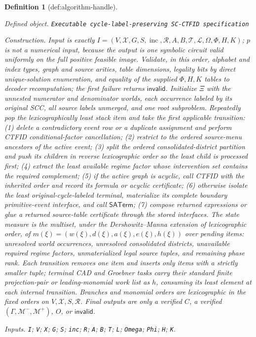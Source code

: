 \documentclass{article}
\newtheorem{definition}{Definition}
\begin{document}
\begin{definition}[def:algorithm-handle]\label{def:algorithm-handle}
\par\smallskip\noindent\emph{Defined object.} \texttt{Executable cycle-\allowbreak{}label-\allowbreak{}preserving SC-\allowbreak{}CTFID specification}
\par\smallskip\noindent\emph{Construction.} Input is exactly \(I=(V,\mathcal X,G,S,\operatorname{inc},\mathcal R,A,B,\mathcal T,\mathcal L,\Omega,\Phi,H,K)\); \(p\) is not a numerical input, because the output is one symbolic circuit valid uniformly on the full positive feasible image. Validate, in this order, alphabet and index types, graph and source arities, table dimensions, legality bits by direct unique-solution enumeration, and equality of the supplied \(\Phi,H,K\) tables to decoder recomputation; the first failure returns \(\mathsf{invalid}\). Initialize \(\Xi\) with the unnested numerator and denominator worlds, each occurrence labeled by its original SCC, all source labels unmerged, and one root subproblem. Repeatedly pop the lexicographically least stack item and take the first applicable transition: (1) delete a contradictory event row or a duplicate assignment and perform CTFID conditional-factor cancellation; (2) restrict to the ordered source-menu ancestors of the active event; (3) split the ordered consolidated-district partition and push its children in reverse lexicographic order so the least child is processed first; (4) extract the least available regime factor whose intervention set contains the required complement; (5) if the active graph is acyclic, call CTFID with the inherited order and record its formula or acyclic certificate; (6) otherwise isolate the least original-cycle-labeled terminal, materialize its complete boundary primitive-event interface, and call \(\mathsf{SATerm}\); (7) compose returned expressions or glue a returned source-table certificate through the stored interfaces. The state measure is the multiset, under the Dershowitz--Manna extension of lexicographic order, of \(m(\xi)=(w(\xi),d(\xi),a(\xi),e(\xi),h(\xi))\) over pending items: unresolved world occurrences, unresolved consolidated districts, unavailable required regime factors, unmaterialized legal source tuples, and remaining phase rank. Each transition removes one item and inserts only items with a strictly smaller tuple; terminal CAD and Groebner tasks carry their standard finite projection-pair or leading-monomial work list as \(h\), consuming its least element at each internal transition. Branches and monomial orders are lexicographic in the fixed orders on \(V,\mathcal X,S,\mathcal R\). Final outputs are only a verified \(C\), a verified \((\Gamma,\mathcal M^-,\mathcal M^+)\), \(O\), or \(\mathsf{invalid}\).
\par\smallskip\noindent\emph{Inputs.} \texttt{I}; \texttt{V}; \texttt{X}; \texttt{G}; \texttt{S}; \texttt{inc}; \texttt{R}; \texttt{A}; \texttt{B}; \texttt{T}; \texttt{L}; \texttt{Omega}; \texttt{Phi}; \texttt{H}; \texttt{K}.
\end{definition}
\end{document}
